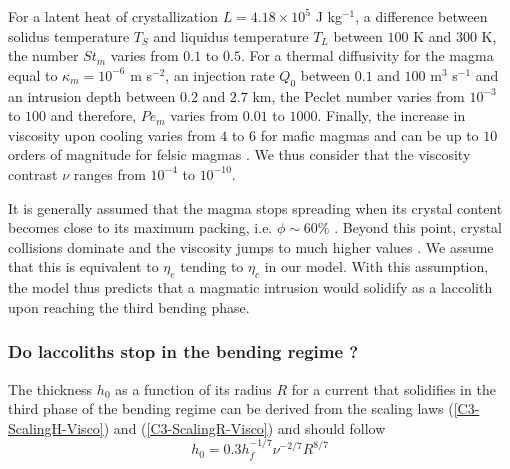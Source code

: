 For a latent heat of crystallization $L = 4.18\times10^5$ J kg$^{-1}$,
a   difference  between   solidus  temperature   $T_S$  and   liquidus
temperature  $T_L$ between  $100$ K  and  $300$ K,  the number  $St_m$
varies from $0.1$  to $0.5$.  For a thermal diffusivity  for the magma
equal  to $\kappa_m=  10^{-6}$  m s$^{-2}$,  an  injection rate  $Q_0$
between $0.1$ and $100$ m$^3$  s$^{-1}$ and an intrusion depth between
$0.2$ and $2.7$  km, the Peclet number varies from  $10^{-3}$ to $100$
and  therefore, $Pe_m$  varies from  $0.01$ to  $1000$.  Finally,  the
increase in  viscosity upon cooling varies  from $4$ to $6$  for mafic
magmas and  can be up  to $10$ orders  of magnitude for  felsic magmas
\citep{Anonymous:CZVBrBvv,Lejeune:1995fc,Giordano:2008em,Diniega:2013eh}.
We  thus  consider  that  the viscosity  contrast  $\nu$  ranges  from
$10^{-4}$ to $10^{-10}$.

It  is generally  assumed  that  the magma  stops  spreading when  its
crystal   content  becomes   close  to   its  maximum   packing,  i.e.
$\phi \sim 60\%$ \citep{Pinkerton:1992fwa}.  Beyond this point, crystal
collisions  dominate and  the viscosity  jumps to  much higher  values
\citep{Lejeune:1995fc,Giordano:2008em}.   We   assume  that   this  is
equivalent to  $\eta_e$ tending to  $\eta_c$ in our model.   With this
assumption, the  model thus predicts  that a magmatic  intrusion would
solidify as a laccolith upon reaching the third bending phase.

\subsubsection*{Do laccoliths stop in the bending regime ?}
\label{C4-sec:range-valu-dimens}

The thickness $h_0$ as a function of its radius $R$ for a current that
solidifies in  the third phase  of the  bending regime can  be derived
from     the     scaling    laws     (\ref{C3-ScalingH-Visco})     and
(\ref{C3-ScalingR-Visco}) and should follow
\begin{equation}
  h_0 = 0.3 h_f^{-1/7}\nu^{-2/7}R^{8/7}\label{C4-Hr}
\end{equation}

